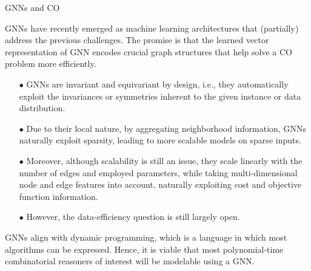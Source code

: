 \documentclass[10pt, aspectratio=169, compress, protectframetitle, handout]{beamer}
\begin{document}
\begin{frame}{GNNs and CO}

    \alert{GNNs} have recently emerged as machine learning architectures that (partially) address the previous challenges. The promise is that the learned vector representation of GNN encodes crucial graph structures that help solve a CO problem more efficiently.
    \begin{itemize}
        \item[\alert{$\bullet$}] GNNs are \alert{invariant and equivariant} by design, i.e., they automatically exploit the invariances or symmetries inherent to the given instance or data distribution.
        \item[\alert{$\bullet$}] Due to their local nature, by aggregating neighborhood information, GNNs naturally \alert{exploit sparsity}, leading to more scalable models on sparse inputs.
        \item[\alert{$\bullet$}] Moreover, although scalability is still an issue, they \alert{scale linearly} with the number of edges and employed parameters, while taking multi-dimensional node and edge features into account, naturally exploiting cost and objective function information.
        \item[\alert{$\bullet$}] However, the \alert{data-efficiency} question is still largely open.
    \end{itemize}
    
    GNNs align with dynamic programming, which is a language in which most algorithms can be expressed. Hence, it is viable that most polynomial-time combinatorial reasoners of interest will be modelable using a GNN.
    
\end{frame}
    


    
    
\end{document}
